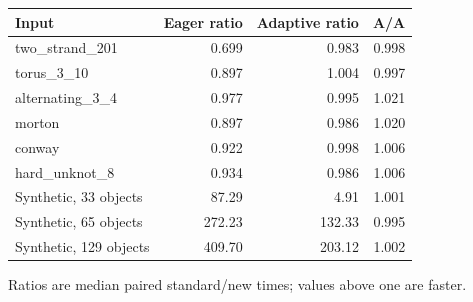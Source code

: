 \begin{center}
\begin{tabular}{@{}lrrr@{}}
\toprule
Input & Eager ratio & Adaptive ratio & A/A \\
\midrule
two\_strand\_201 & 0.699 & 0.983 & 0.998 \\
torus\_3\_10 & 0.897 & 1.004 & 0.997 \\
alternating\_3\_4 & 0.977 & 0.995 & 1.021 \\
morton & 0.897 & 0.986 & 1.020 \\
conway & 0.922 & 0.998 & 1.006 \\
hard\_unknot\_8 & 0.934 & 0.986 & 1.006 \\
\midrule
Synthetic, 33 objects & 87.29 & 4.91 & 1.001 \\
Synthetic, 65 objects & 272.23 & 132.33 & 0.995 \\
Synthetic, 129 objects & 409.70 & 203.12 & 1.002 \\
\bottomrule
\end{tabular}
\end{center}
Ratios are median paired standard/new times; values above one are faster.
